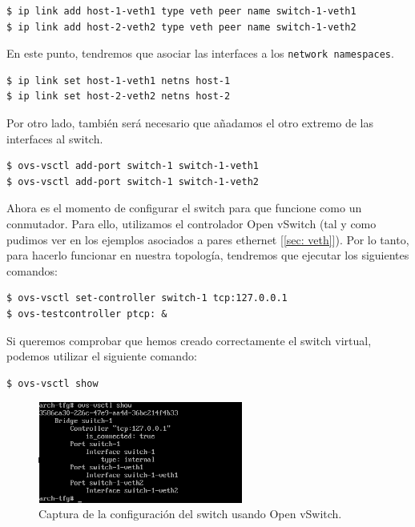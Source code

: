 \documentclass[a4paper, oneside, 12pt]{book}
\begin{document}
	\begin{verbatim}
$ ip link add host-1-veth1 type veth peer name switch-1-veth1
$ ip link add host-2-veth2 type veth peer name switch-1-veth2
	\end{verbatim}

	\pagebreak

	\noindent En este punto, tendremos que asociar las interfaces a los \texttt{network namespaces}.
	
	\begin{verbatim}
$ ip link set host-1-veth1 netns host-1
$ ip link set host-2-veth2 netns host-2
	\end{verbatim}

	\noindent Por otro lado, también será necesario que añadamos el otro extremo de las interfaces al switch.
	
	\begin{verbatim}
$ ovs-vsctl add-port switch-1 switch-1-veth1
$ ovs-vsctl add-port switch-1 switch-1-veth2
	\end{verbatim}

	\noindent Ahora es el momento de configurar el switch para que funcione como un conmutador. Para ello, utilizamos el controlador Open vSwitch (tal y como pudimos ver en los ejemplos asociados a pares ethernet [\ref{sec: veth}]). Por lo tanto, para hacerlo funcionar en nuestra topología, tendremos que ejecutar los siguientes comandos:
	
	\begin{verbatim}
$ ovs-vsctl set-controller switch-1 tcp:127.0.0.1
$ ovs-testcontroller ptcp: &
	\end{verbatim}

	\noindent Si queremos comprobar que hemos creado correctamente el switch virtual, podemos utilizar el siguiente comando:
	
	\begin{verbatim}
$ ovs-vsctl show
	\end{verbatim}
	
	\begin{figure}[h!]
		\begin{center}
			\includegraphics[width=0.6\textwidth]{img/ns_single_1.png}
			\caption{Captura de la configuración del switch usando Open vSwitch.}
		\end{center}
	\end{figure}
	
\end{document}
